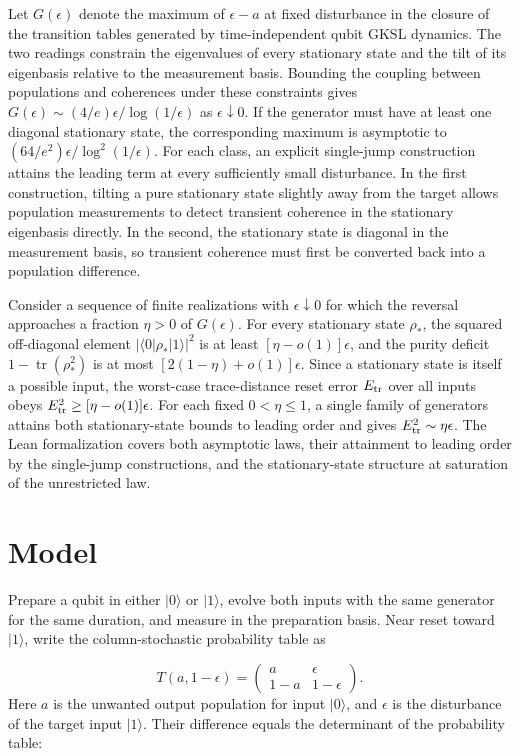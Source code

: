 \documentclass[aps,pra,reprint,amsmath,amssymb,nofootinbib,floatfix,longbibliography]{revtex4-2}
\theoremstyle{aps}
\DeclareMathOperator{\tr}{tr}
\newcommand{\eps}{\epsilon}
\newcommand{\ket}[1]{|#1\rangle}
\newcommand{\bra}[1]{\langle#1|}
\begin{document}
Let $G(\eps)$ denote the maximum of $\eps-a$ at fixed disturbance in the closure of the transition tables generated by time-independent qubit GKSL dynamics. The two readings constrain the eigenvalues of every stationary state and the tilt of its eigenbasis relative to the measurement basis. Bounding the coupling between populations and coherences under these constraints gives $G(\eps)\sim(4/e)\eps/\log(1/\eps)$ as $\eps\downarrow0$. If the generator must have at least one diagonal stationary state, the corresponding maximum is asymptotic to $(64/e^2)\eps/\log^2(1/\eps)$. For each class, an explicit single-jump construction attains the leading term at every sufficiently small disturbance. In the first construction, tilting a pure stationary state slightly away from the target allows population measurements to detect transient coherence in the stationary eigenbasis directly. In the second, the stationary state is diagonal in the measurement basis, so transient coherence must first be converted back into a population difference.

Consider a sequence of finite realizations with $\eps\downarrow0$ for which the reversal approaches a fraction $\eta>0$ of $G(\eps)$. For every stationary state $\rho_*$, the squared off-diagonal element $|\bra0\rho_*\ket1|^2$ is at least $[\eta-o(1)]\eps$, and the purity deficit $1-\tr(\rho_*^2)$ is at most $[2(1-\eta)+o(1)]\eps$. Since a stationary state is itself a possible input, the worst-case trace-distance reset error $E_{\rm tr}$ over all inputs obeys $E_{\rm tr}^2\ge[\eta-o(1)]\eps$. For each fixed $0<\eta\le1$, a single family of generators attains both stationary-state bounds to leading order and gives $E_{\rm tr}^2\sim\eta\eps$. The Lean formalization covers both asymptotic laws, their attainment to leading order by the single-jump constructions, and the stationary-state structure at saturation of the unrestricted law.

\section{Model}\label{sec:model}

Prepare a qubit in either $\ket0$ or $\ket1$, evolve both inputs with the same generator for the same duration, and measure in the preparation basis. Near reset toward $\ket1$, write the column-stochastic probability table as

\begin{equation}\label{eq:table}
 T(a,1-\eps)=\begin{pmatrix}a&\eps\\1-a&1-\eps\end{pmatrix}.
\end{equation}
Here $a$ is the unwanted output population for input $\ket0$, and $\eps$ is the disturbance of the target input $\ket1$. Their difference equals the determinant of the probability table:
\end{document}
